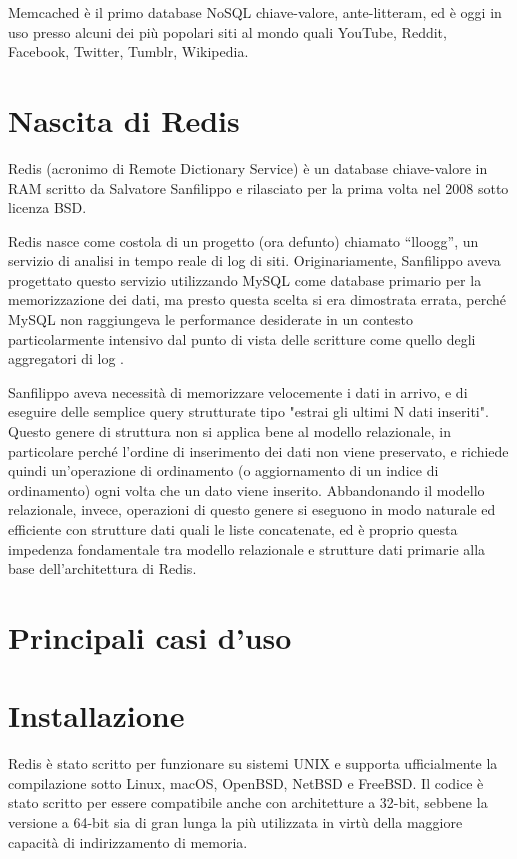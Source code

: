 Memcached è il primo database NoSQL chiave-valore, ante-litteram, ed è oggi in uso presso alcuni
dei più popolari siti al mondo quali YouTube, Reddit, Facebook, Twitter, Tumblr, Wikipedia.


\section{Nascita di Redis}

Redis (acronimo di Remote Dictionary Service) è un database chiave-valore in RAM scritto
da Salvatore Sanfilippo e rilasciato per la prima volta nel 2008 sotto licenza BSD.

Redis nasce come costola di un progetto (ora defunto) chiamato ``lloogg'', un servizio di
analisi in tempo reale di log di siti. Originariamente, Sanfilippo aveva progettato
questo servizio utilizzando MySQL come database primario per la memorizzazione dei
dati, ma presto questa scelta si era dimostrata errata, perché MySQL non raggiungeva le
performance desiderate in un contesto particolarmente intensivo dal punto di vista delle
scritture come quello degli aggregatori di log \cite{nascita}.

Sanfilippo aveva necessità di memorizzare velocemente i dati in arrivo, e di eseguire
delle semplice query strutturate tipo "estrai gli ultimi N dati inseriti". Questo genere
di struttura non si applica bene al modello relazionale, in particolare perché l'ordine
di inserimento dei dati non viene preservato, e richiede quindi un'operazione di ordinamento
(o aggiornamento di un indice di ordinamento) ogni volta che un dato viene inserito.
Abbandonando il modello relazionale, invece, operazioni di questo genere si eseguono
in modo naturale ed efficiente con strutture dati quali le liste concatenate, ed è
proprio questa impedenza fondamentale tra modello relazionale e strutture dati primarie
alla base dell'architettura di Redis.

\section{Principali casi d'uso}


\section{Installazione}

Redis è stato scritto per funzionare su sistemi UNIX e supporta ufficialmente la
compilazione sotto Linux, macOS, OpenBSD, NetBSD e FreeBSD. Il codice è stato scritto
per essere compatibile anche con architetture a 32-bit, sebbene la versione a 64-bit
sia di gran lunga la più utilizzata in virtù della maggiore capacità di indirizzamento
di memoria.

